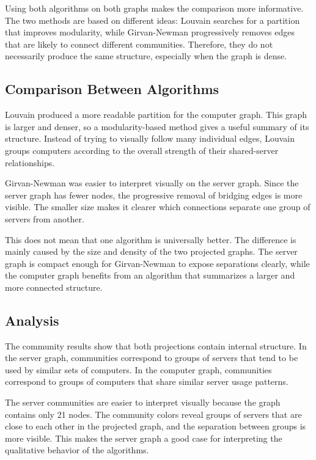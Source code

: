 \documentclass[11pt,a4paper]{article}
\begin{document}
Using both algorithms on both graphs makes the comparison more informative. The two methods are based on different ideas: Louvain searches for a partition that improves modularity, while Girvan-Newman progressively removes edges that are likely to connect different communities. Therefore, they do not necessarily produce the same structure, especially when the graph is dense.

\subsection{Comparison Between Algorithms}

Louvain produced a more readable partition for the computer graph. This graph is larger and denser, so a modularity-based method gives a useful summary of its structure. Instead of trying to visually follow many individual edges, Louvain groups computers according to the overall strength of their shared-server relationships.

Girvan-Newman was easier to interpret visually on the server graph. Since the server graph has fewer nodes, the progressive removal of bridging edges is more visible. The smaller size makes it clearer which connections separate one group of servers from another.

This does not mean that one algorithm is universally better. The difference is mainly caused by the size and density of the two projected graphs. The server graph is compact enough for Girvan-Newman to expose separations clearly, while the computer graph benefits from an algorithm that summarizes a larger and more connected structure.

\subsection{Analysis}

The community results show that both projections contain internal structure. In the server graph, communities correspond to groups of servers that tend to be used by similar sets of computers. In the computer graph, communities correspond to groups of computers that share similar server usage patterns.

The server communities are easier to interpret visually because the graph contains only 21 nodes. The community colors reveal groups of servers that are close to each other in the projected graph, and the separation between groups is more visible. This makes the server graph a good case for interpreting the qualitative behavior of the algorithms.
\end{document}

